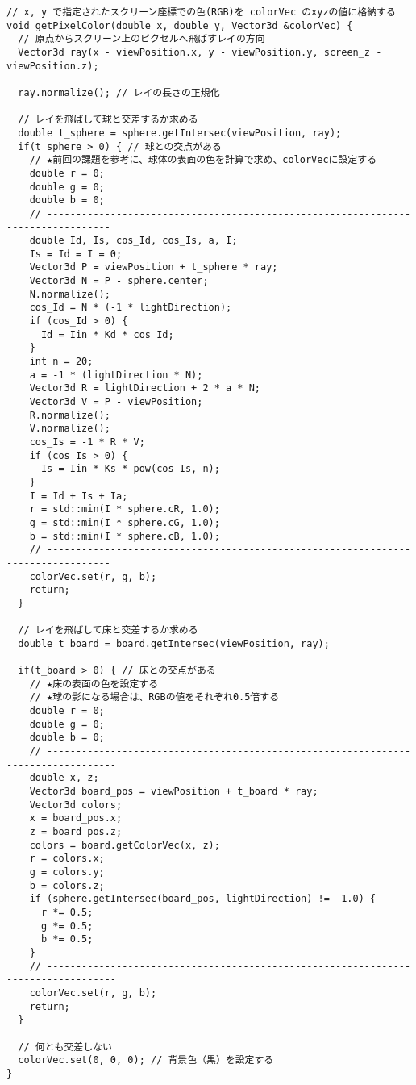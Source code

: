 \documentclass{scrartcl}
\begin{document}
\begin{verbatim}
// x, y で指定されたスクリーン座標での色(RGB)を colorVec のxyzの値に格納する
void getPixelColor(double x, double y, Vector3d &colorVec) {
  // 原点からスクリーン上のピクセルへ飛ばすレイの方向
  Vector3d ray(x - viewPosition.x, y - viewPosition.y, screen_z - viewPosition.z);

  ray.normalize(); // レイの長さの正規化

  // レイを飛ばして球と交差するか求める
  double t_sphere = sphere.getIntersec(viewPosition, ray);
  if(t_sphere > 0) { // 球との交点がある
    // ★前回の課題を参考に、球体の表面の色を計算で求め、colorVecに設定する
    double r = 0;
    double g = 0;
    double b = 0;
    // ---------------------------------------------------------------------------------
    double Id, Is, cos_Id, cos_Is, a, I;
    Is = Id = I = 0;
    Vector3d P = viewPosition + t_sphere * ray;
    Vector3d N = P - sphere.center;
    N.normalize();
    cos_Id = N * (-1 * lightDirection);
    if (cos_Id > 0) {
      Id = Iin * Kd * cos_Id;
    }
    int n = 20;
    a = -1 * (lightDirection * N);
    Vector3d R = lightDirection + 2 * a * N;
    Vector3d V = P - viewPosition;
    R.normalize();
    V.normalize();
    cos_Is = -1 * R * V;
    if (cos_Is > 0) {
      Is = Iin * Ks * pow(cos_Is, n);
    }
    I = Id + Is + Ia;
    r = std::min(I * sphere.cR, 1.0);
    g = std::min(I * sphere.cG, 1.0);
    b = std::min(I * sphere.cB, 1.0);
    // ---------------------------------------------------------------------------------
    colorVec.set(r, g, b);
    return;
  }

  // レイを飛ばして床と交差するか求める
  double t_board = board.getIntersec(viewPosition, ray);

  if(t_board > 0) { // 床との交点がある
    // ★床の表面の色を設定する
    // ★球の影になる場合は、RGBの値をそれぞれ0.5倍する
    double r = 0;
    double g = 0;
    double b = 0;
    // ----------------------------------------------------------------------------------
    double x, z;
    Vector3d board_pos = viewPosition + t_board * ray;
    Vector3d colors;
    x = board_pos.x;
    z = board_pos.z;
    colors = board.getColorVec(x, z);
    r = colors.x;
    g = colors.y;
    b = colors.z;
    if (sphere.getIntersec(board_pos, lightDirection) != -1.0) {
      r *= 0.5;
      g *= 0.5;
      b *= 0.5;
    } 
    // ----------------------------------------------------------------------------------
    colorVec.set(r, g, b);
    return;
  }

  // 何とも交差しない
  colorVec.set(0, 0, 0); // 背景色（黒）を設定する
}


\end{verbatim}
\end{document}
